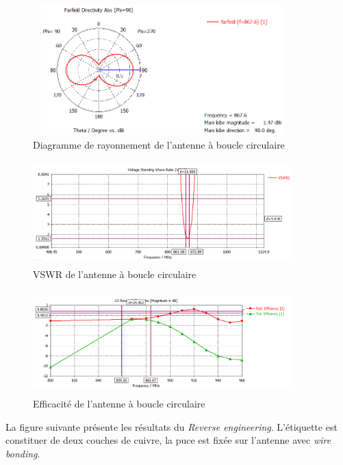 \documentclass[11pt, a4paper, twoside]{book}
\begin{document}
\begin{figure}[H]
\centering
\includegraphics[width=10cm,height=5cm]{claPattern}
\caption{Diagramme de rayonnement de l'antenne à  boucle circulaire}
\end{figure} 

\begin{figure}[H]
\centering
\includegraphics[width=10cm,height=4cm]{claaavswr}
\caption{VSWR de l'antenne à  boucle circulaire}
\end{figure} 

\begin{figure}[H]
\centering
\includegraphics[width=10cm,height=4cm]{clawefficency}
\caption{Efficacité de l'antenne à  boucle circulaire}
\end{figure} 


La figure suivante présente les résultats du \emph{Reverse engineering}. L’étiquette est constituer de deux couches de cuivre, la puce est fixée sur l'antenne  avec \emph{wire bonding}. \\
\end{document}
